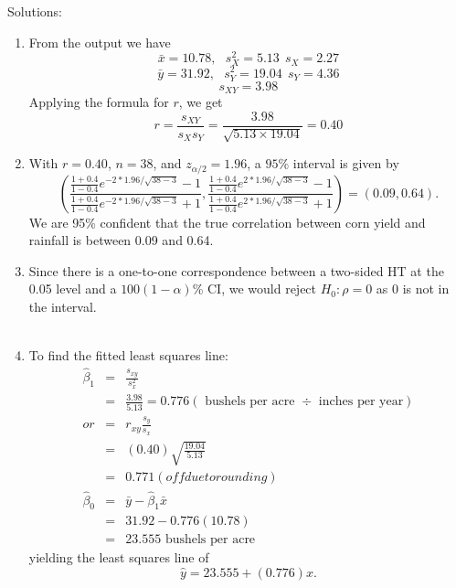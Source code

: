 Solutions:
\begin{enumerate}
\item From the output we have
$$ \bar{x}=10.78, \ \ \ s^2_X=5.13 \ \ s_X = 2.27$$
$$ \bar{y}=31.92, \ \ \ s^2_Y=19.04 \ \ s_Y = 4.36$$ 
$$ s_{XY}=3.98$$
Applying the formula for $r$, we get
$$ r=\frac{s_{XY}}{s_X s_Y}=\frac{3.98}{\sqrt{5.13 \times 19.04}} =0.40$$

\item With $r=0.40$, $n=38$, and $z_{\alpha/2}=1.96$, a $95\%$ interval is given by
$$ \left(\frac{\frac{1+0.4}{1-0.4}e^{-2*1.96/\sqrt{38-3}}-1}{\frac{1+0.4}{1-0.4}e^{-2*1.96/\sqrt{38-3}}+1}, \frac{\frac{1+0.4}{1-0.4}e^{2*1.96/\sqrt{38-3}}-1}{\frac{1+0.4}{1-0.4}e^{2*1.96/\sqrt{38-3}}+1}\right)=(0.09,0.64).$$
We are 95\% confident that the true correlation between corn yield and rainfall is between 0.09 and 0.64.
\item Since there is a one-to-one correspondence between a two-sided HT at the 0.05 level and a $100(1-\alpha)$\% CI, we would reject $H_0:\rho=0$ as 0 is not in the interval.\\~\\

\item To find the fitted least squares line:
\begin{eqnarray*}\hat{\beta}_1 &=& \frac{s_{xy}}{s_x^2} \\
&=& \frac{3.98}{5.13} =0.776 (\mbox{ bushels per acre }\div \mbox{ inches per year})\\
or &=& r_{xy}\frac{s_y}{s_x} \\
&=& (0.40) \sqrt{\frac{19.04}{5.13}}\\
&=& 0.771 (off due to rounding)\\
\hat{\beta}_0 &=& \bar{y}-\hat\beta_1 \bar{x}\\
&=& 31.92- 0.776 (10.78) \\
&=& 23.555 \mbox{ bushels per acre } 
\end{eqnarray*}
yielding the least squares line of
$$ \hat{y}=23.555 + (0.776) x. $$


\end{enumerate}
